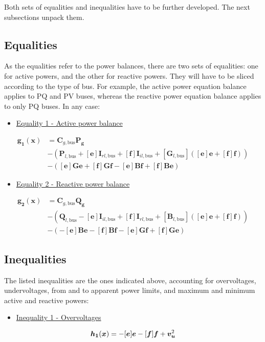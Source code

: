 \documentclass{article}
\begin{document}
Both sets of equalities and inequalities have to be further developed. The next subsections unpack them.

\subsection{Equalities}
As the equalities refer to the power balances, there are two sets of equalities: one for active powers, and the other for reactive powers. They will have to be sliced according to the type of bus. For example, the active power equation balance applies to PQ and PV buses, whereas the reactive power equation balance applies to only PQ buses. In any case:

\begin{itemize}
    \item \underline{Equality 1 - Active power balance}
\end{itemize}
\begin{equation}
    \begin{split}
    \bm{g_1}(\bm{x}) &= \bm{C}_{g,\text{bus}} \bm{P_g} \\ 
                     &- (\bm{P}_{l,\text{bus}} + [\bm{e}]\bm{I}_{rl,\text{bus}} + [\bm{f}]\bm{I}_{il,\text{bus}} + [\bm{G}_{l,\text{bus}}]([\bm{e}]\bm{e} + [\bm{f}]\bm{f})) \\
                     &- ([\bm{e}]\bm{G}\bm{e} + [\bm{f}]\bm{G}\bm{f} - [\bm{e}]\bm{B}\bm{f} + [\bm{f}]\bm{B}\bm{e})
    \end{split}
\end{equation}

\begin{itemize}
    \item \underline{Equality 2 - Reactive power balance}
\end{itemize}
\begin{equation}
    \begin{split}
    \bm{g_2}(\bm{x}) &= \bm{C}_{g,\text{bus}} \bm{Q_g} \\
                     &- (\bm{Q}_{l,\text{bus}} -[\bm{e}]\bm{I}_{il,\text{bus}} + [\bm{f}]\bm{I}_{rl,\text{bus}} + [\bm{B}_{l,\text{bus}}]([\bm{e}]\bm{e} + [\bm{f}]\bm{f})) \\
                     &- (-[\bm{e}]\bm{B}\bm{e} - [\bm{f}]\bm{B}\bm{f} - [\bm{e}]\bm{G}\bm{f} + [\bm{f}]\bm{G}\bm{e})
    \end{split}
\end{equation}

\subsection{Inequalities}
The listed inequalities are the ones indicated above, accounting for overvoltages, undervoltages, from and to apparent power limits, and maximum and minimum active and reactive powers:
\begin{itemize}
    \item \underline{Inequality 1 - Overvoltages}
\end{itemize}
\begin{equation}
    \bm{h_1}(\bm{x}) = - [\bm{e}]\bm{e} - [\bm{f}]\bm{f} + \bm{v_u}^2 \\
\end{equation}
\end{document}
